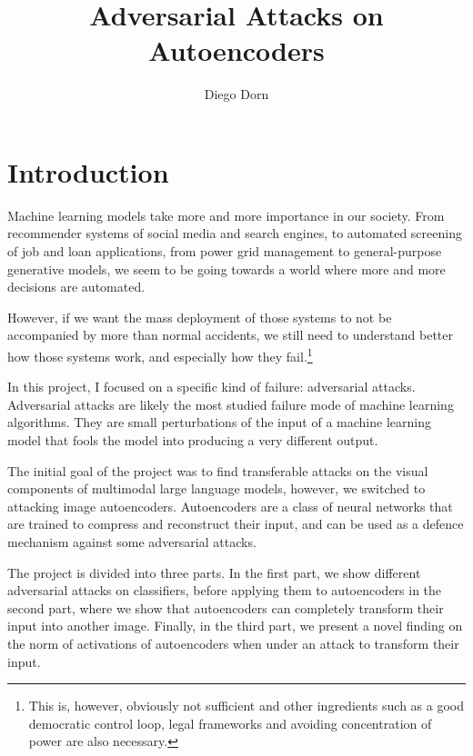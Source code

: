 \documentclass[]{scrarticle}
\title{Adversarial Attacks on Autoencoders}
\author{Diego Dorn}
\renewcommand{\todo}[1]{}
\begin{document}




\section*{Introduction}

Machine learning models take more and more importance in our society.
From recommender systems of social media and search engines,
to automated screening of job and loan applications,
from power grid management
to general-purpose generative models,
we seem to be going towards a world where more and more decisions
are automated.

However, if we want the mass deployment of those systems
to not be accompanied by more than normal accidents,
we still need to understand better how those systems work,
and especially how they fail.\footnote{
  This is, however, obviously not sufficient
  and other ingredients such as a good democratic control loop,
  legal frameworks and avoiding concentration of power
  are also necessary.}

In this project, I focused on a specific kind of failure:
adversarial attacks. Adversarial attacks are likely the most
studied failure mode of machine learning algorithms.
They are small perturbations
of the input of a machine learning model that
fools the model into producing a very different output.

The initial goal of the project was to find transferable attacks
on the visual components of multimodal large language models,
however, we switched to attacking image autoencoders.
Autoencoders are a class of neural networks that are trained
to compress and reconstruct their input, and can be used
as a defence mechanism against some adversarial attacks.

The project is divided into three parts. In the first part,
we show different adversarial attacks on classifiers,
before applying them to autoencoders in the second part,
where we show that autoencoders can completely
transform their input into another image.
Finally, in the third part, we present
a novel finding on the norm of activations of
autoencoders when under an attack to transform their input.



\end{document}
